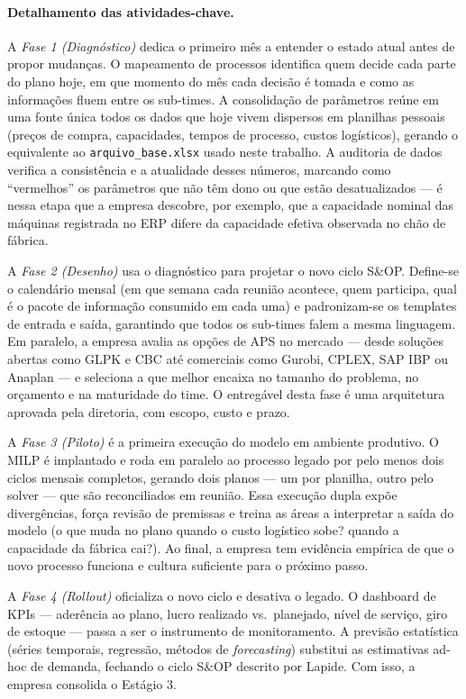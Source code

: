 \documentclass[11pt,a4paper]{article}
\begin{document}
\paragraph{Detalhamento das atividades-chave.}
A \emph{Fase 1 (Diagnóstico)} dedica o primeiro mês a entender o estado atual antes de propor mudanças. O mapeamento de processos identifica quem decide cada parte do plano hoje, em que momento do mês cada decisão é tomada e como as informações fluem entre os sub-times. A consolidação de parâmetros reúne em uma fonte única todos os dados que hoje vivem dispersos em planilhas pessoais (preços de compra, capacidades, tempos de processo, custos logísticos), gerando o equivalente ao \texttt{arquivo\_base.xlsx} usado neste trabalho. A auditoria de dados verifica a consistência e a atualidade desses números, marcando como ``vermelhos'' os parâmetros que não têm dono ou que estão desatualizados --- é nessa etapa que a empresa descobre, por exemplo, que a capacidade nominal das máquinas registrada no ERP difere da capacidade efetiva observada no chão de fábrica.

A \emph{Fase 2 (Desenho)} usa o diagnóstico para projetar o novo ciclo S\&OP. Define-se o calendário mensal (em que semana cada reunião acontece, quem participa, qual é o pacote de informação consumido em cada uma) e padronizam-se os templates de entrada e saída, garantindo que todos os sub-times falem a mesma linguagem. Em paralelo, a empresa avalia as opções de APS no mercado --- desde soluções abertas como GLPK e CBC até comerciais como Gurobi, CPLEX, SAP IBP ou Anaplan --- e seleciona a que melhor encaixa no tamanho do problema, no orçamento e na maturidade do time. O entregável desta fase é uma arquitetura aprovada pela diretoria, com escopo, custo e prazo.

A \emph{Fase 3 (Piloto)} é a primeira execução do modelo em ambiente produtivo. O MILP é implantado e roda em paralelo ao processo legado por pelo menos dois ciclos mensais completos, gerando dois planos --- um por planilha, outro pelo solver --- que são reconciliados em reunião. Essa execução dupla expõe divergências, força revisão de premissas e treina as áreas a interpretar a saída do modelo (o que muda no plano quando o custo logístico sobe? quando a capacidade da fábrica cai?). Ao final, a empresa tem evidência empírica de que o novo processo funciona e cultura suficiente para o próximo passo.

A \emph{Fase 4 (Rollout)} oficializa o novo ciclo e desativa o legado. O dashboard de KPIs --- aderência ao plano, lucro realizado vs.\ planejado, nível de serviço, giro de estoque --- passa a ser o instrumento de monitoramento. A previsão estatística (séries temporais, regressão, métodos de \emph{forecasting}) substitui as estimativas ad-hoc de demanda, fechando o ciclo S\&OP descrito por Lapide. Com isso, a empresa consolida o Estágio 3.
\end{document}
